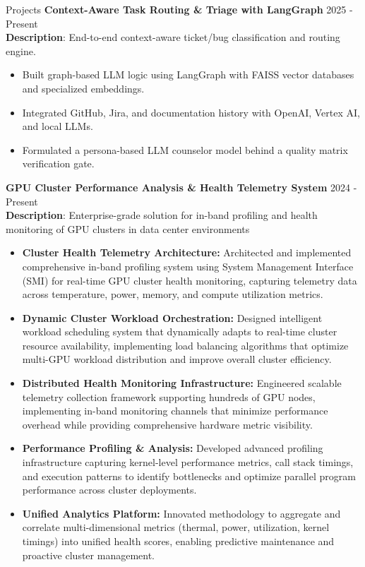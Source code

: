 \documentclass{resume} %
\begin{document}
\begin{rSection}{Projects}
{\bf Context-Aware Task Routing \& Triage with LangGraph} \hfill {2025 - Present}\\
\textbf{Description}: End-to-end context-aware ticket/bug classification and routing engine.
\begin{itemize}
    \item Built graph-based LLM logic using LangGraph with FAISS vector databases and specialized embeddings.
    \item Integrated GitHub, Jira, and documentation history with OpenAI, Vertex AI, and local LLMs.
    \item Formulated a persona-based LLM counselor model behind a quality matrix verification gate.
\end{itemize}

{\bf GPU Cluster Performance Analysis \& Health Telemetry System} \hfill {2024 - Present}\\
\textbf{Description}: Enterprise-grade solution for in-band profiling and health monitoring of GPU clusters in data center environments

\begin{itemize}
    \item \textbf{Cluster Health Telemetry Architecture:} Architected and implemented comprehensive in-band profiling system using System Management Interface (SMI) for real-time GPU cluster health monitoring, capturing telemetry data across temperature, power, memory, and compute utilization metrics.
    \item \textbf{Dynamic Cluster Workload Orchestration:} Designed intelligent workload scheduling system that dynamically adapts to real-time cluster resource availability, implementing load balancing algorithms that optimize multi-GPU workload distribution and improve overall cluster efficiency.
    \item \textbf{Distributed Health Monitoring Infrastructure:} Engineered scalable telemetry collection framework supporting hundreds of GPU nodes, implementing in-band monitoring channels that minimize performance overhead while providing comprehensive hardware metric visibility.
    \item \textbf{Performance Profiling \& Analysis:} Developed advanced profiling infrastructure capturing kernel-level performance metrics, call stack timings, and execution patterns to identify bottlenecks and optimize parallel program performance across cluster deployments.
    \item \textbf{Unified Analytics Platform:} Innovated methodology to aggregate and correlate multi-dimensional metrics (thermal, power, utilization, kernel timings) into unified health scores, enabling predictive maintenance and proactive cluster management.
\end{itemize}


\end{rSection}
\end{document}
